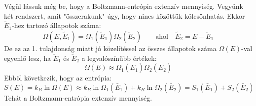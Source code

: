 \documentclass[../main.tex]{subfiles}
\begin{document}
Végül lássuk még be, hogy a Boltzmann-entrópia extenzív mennyiség. Vegyünk két rendszert, amit "összerakunk" úgy, hogy nincs közöttük kölcsönhatás. Ekkor $\tilde{E}_1$-hez tartozó állapotok száma:
\begin{equation}
    \Omega(E, \tilde{E}_1) = \Omega_1(\tilde{E}_1) \Omega_2(\tilde{E}_2) \qquad \text{ahol} \quad \tilde{E}_2 = E - \tilde{E}_1
\end{equation}
De ez az 1. tulajdonság miatt jó közelítéssel az összes állapotok száma $\Omega(E)$-val egyenlő lesz, ha $\tilde{E}_1$ és $\tilde{E}_2$ a legvalószínűbb értékek:
\begin{equation}
    \Omega(E) \approx \Omega_1(\bar{E}_1) \Omega_2(\bar{E}_2)
\end{equation}
Ebből következik, hogy az entrópia:
\begin{equation}
    S(E) = k_B \ln \Omega(E) \approx k_B \ln \Omega_1(\bar{E}_1) + k_B \ln \Omega_2(\bar{E}_2) = S_1(\bar{E}_1) + S_2(\bar{E}_2)
\end{equation}
Tehát a Boltzmann-entrópia extenzív mennyiség.
\end{document}
